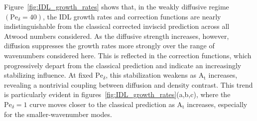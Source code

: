 \documentclass[11pt]{article}
\newcommand{\Atw}{\mathrm{A_t}}
\newcommand{\Pe}{\mathrm{Pe}}
\begin{document}
Figure~\ref{fig:IDL_growth_rates} shows that, in the weakly diffusive regime \((\Pe_{\delta}=40)\), the IDL growth rates and correction functions are nearly indistinguishable from the classical corrected inviscid prediction across all Atwood numbers considered. As the diffusive strength increases, however, diffusion suppresses the growth rates more strongly over the range of wavenumbers considered here. This is reflected in the correction functions, which progressively depart from the classical prediction and indicate an increasingly stabilizing influence. At fixed \(\Pe_{\delta}\), this stabilization weakens as \(\Atw\) increases, revealing a nontrivial coupling between diffusion and density contrast. This trend is particularly evident in figures~\ref{fig:IDL_growth_rates}(a,b,c), where the \(\Pe_{\delta}=1\) curve moves closer to the classical prediction as \(\Atw\) increases, especially for the smaller-wavenumber modes. 
\end{document}
